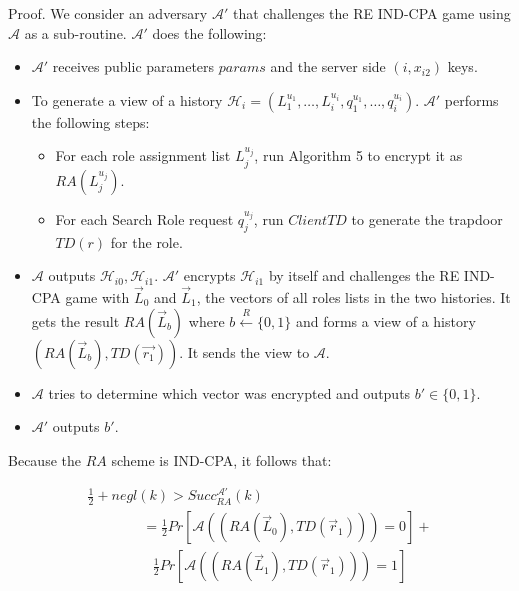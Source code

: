 \documentclass[final,5p,times,twocolumn]{elsarticle}
\begin{document}
Proof. We consider an adversary $\mathcal{A}'$ that challenges the RE IND-CPA game using $\mathcal{A}$ as a sub-routine. $\mathcal{A}'$ does the following:
\begin{itemize}
\item $\mathcal{A}'$ receives public parameters $params$ and the server side $(i,x_{i2})$ keys. 


\item To generate a view of a history $\mathcal{H}_i=(L_1^{u_1},\ldots,L_i^{u_i}, q_1^{u_1},\ldots, q_i^{u_i})$. $\mathcal{A}'$ performs the following steps:
\begin{itemize}
\item For each role assignment list $L_j^{u_j}$, run Algorithm 5 to encrypt it as $RA(L_j^{u_j})$. 
\item For each Search Role request $q_j^{u_j}$, run $ClientTD$ to generate the trapdoor $TD(r)$ for the role.
\end{itemize}

\item $\mathcal{A}$ outputs $\mathcal{H}_{i0},\mathcal{H}_{i1}$. $\mathcal{A}'$ encrypts $\mathcal{H}_{i1}$ by itself and challenges the RE IND-CPA game with $\vec{L}_0$ and $\vec{L}_1$, the vectors of all roles lists in the two histories. It gets the result $RA(\vec{L}_b)$ where $b \xleftarrow{R} \{0,1\}$ and forms a view of a history $(RA(\vec{L}_b), TD(\vec{r_1}))$. It sends the view to $\mathcal{A}$.

\item $\mathcal{A}$ tries to determine which vector was encrypted and outputs $b' \in \{0,1\}$.

\item $\mathcal{A'}$ outputs $b'$.

\end{itemize}

Because the $RA$ scheme is IND-CPA, it follows that:

\begin{equation}
\begin{array}{l}
\frac{1}{2} + negl(k)  >  Succ_{RA}^{\mathcal{A}'}(k) \\
\hspace{47pt} = \frac{1}{2}Pr[\mathcal{A}((RA(\vec{L}_0),TD(\vec{r}_1)))=0]+\\
\hspace{56pt} \frac{1}{2}Pr[\mathcal{A}((RA(\vec{L}_1),TD(\vec{r}_1)))=1]
\end{array}
\end{equation}
\end{document}
